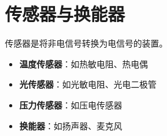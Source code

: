 
\section{传感器与换能器}
\label{sec:sensors_transducers}

传感器是将非电信号转换为电信号的装置。

\begin{itemize}
    \item \textbf{温度传感器}：如热敏电阻、热电偶
    \item \textbf{光传感器}：如光敏电阻、光电二极管
    \item \textbf{压力传感器}：如压电传感器
    \item \textbf{换能器}：如扬声器、麦克风
\end{itemize}
